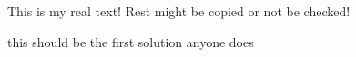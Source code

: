 This is my real text! Rest might be copied or not be checked!

this should be the first solution anyone does
